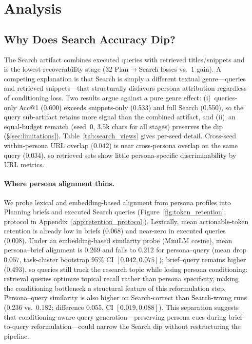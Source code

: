 \documentclass[]{article}
\begin{document}
\FloatBarrier
\section{Analysis}
\label{sec:analysis}

\subsection{Why Does Search Accuracy Dip?}

The Search artifact combines executed queries with retrieved titles/snippets
and is the lowest-recoverability stage (32 Plan$\to$Search losses vs.\ 1 gain).
A competing explanation is that Search is simply a different textual
genre---queries and retrieved snippets---that structurally disfavors persona
attribution regardless of conditioning loss.
Two results argue against a pure genre effect: (i)~queries-only Acc@1
(0.600) exceeds snippets-only (0.533) and full Search (0.550), so the
query sub-artifact retains more signal than the combined artifact,
and (ii)~an equal-budget rematch (seed~0, 3.5k chars for all stages) preserves the dip (\S\ref{sec:limitations}).
Table~\ref{tab:search_views} gives per-seed detail. Cross-seed within-persona
URL overlap (0.042) is near cross-persona overlap on the same query (0.034),
so retrieved sets show little persona-specific discriminability by URL metrics.

\paragraph{Where persona alignment thins.}
We probe lexical and embedding-based alignment from persona profiles into
Planning briefs and executed Search queries
(Figure~\ref{fig:token_retention}; protocol in
Appendix~\ref{app:retention_protocol}).
Lexically, mean actionable-token retention is already low in briefs (0.068)
and near-zero in executed queries (0.008).
Under an embedding-based similarity probe (MiniLM cosine), mean
persona--brief alignment is 0.269 and falls to 0.212 for persona--query
(mean drop $0.057$, task-cluster bootstrap 95\% CI $[0.042,0.075]$);
brief--query remains higher (0.493), so queries still track the research topic
while losing persona conditioning: retrieval queries optimize topical recall
rather than persona specificity, making the conditioning bottleneck a
structural feature of this reformulation step.
Persona--query similarity is also higher on Search-correct than Search-wrong
runs (0.236 vs.\ 0.182; difference $0.055$, CI $[0.019,0.088]$).
This separation suggests that conditioning-aware query generation---preserving
persona cues during brief-to-query reformulation---could narrow the Search dip
without restructuring the pipeline.
\end{document}
